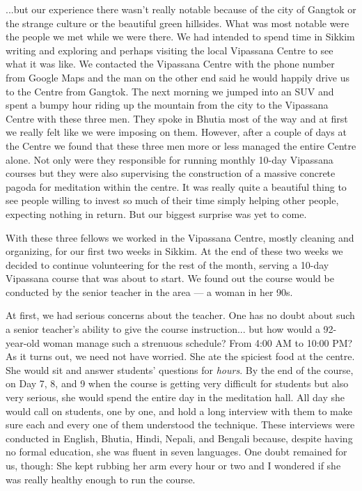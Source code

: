 \documentclass{article}
\begin{document}
...but our experience there wasn't really notable because of the city of Gangtok or
the strange culture or the beautiful green hillsides. What was most notable were the
people we met while we were there. We had intended to spend time in Sikkim writing
and exploring and perhaps visiting the local Vipassana Centre to see what it was
like. We contacted the Vipassana Centre with the phone number from Google Maps and
the man on the other end said he would happily drive us to the Centre from
Gangtok. The next morning we jumped into an SUV and spent a bumpy hour riding up the
mountain from the city to the Vipassana Centre with these three men. They spoke in
Bhutia most of the way and at first we really felt like we were imposing on
them. However, after a couple of days at the Centre we found that these three men
more or less managed the entire Centre alone. Not only were they responsible for
running monthly 10-day Vipassana courses but they were also supervising the
construction of a massive concrete pagoda for meditation within the centre. It was
really quite a beautiful thing to see people willing to invest so much of their time
simply helping other people, expecting nothing in return. But our biggest surprise
was yet to come.

With these three fellows we worked in the Vipassana Centre, mostly cleaning and
organizing, for our first two weeks in Sikkim. At the end of these two weeks we
decided to continue volunteering for the rest of the month, serving a 10-day
Vipassana course that was about to start. We found out the course would be conducted
by the senior teacher in the area --- a woman in her 90s.

At first, we had serious concerns about the teacher. One has no doubt about such a
senior teacher's ability to give the course instruction... but how would a
92-year-old woman manage such a strenuous schedule? From 4:00 AM to 10:00 PM? As it
turns out, we need not have worried. She ate the spiciest food at the centre. She
would sit and answer students' questions for \textit{hours}. By the end of the
course, on Day 7, 8, and 9 when the course is getting very difficult for students but
also very serious, she would spend the entire day in the meditation hall. All day she
would call on students, one by one, and hold a long interview with them to make sure
each and every one of them understood the technique. These interviews were conducted
in English, Bhutia, Hindi, Nepali, and Bengali because, despite having no formal education,
she was fluent in seven languages. One doubt remained for us, though: She kept
rubbing her arm every hour or two and I wondered if she was really healthy enough to
run the course.
\end{document}
